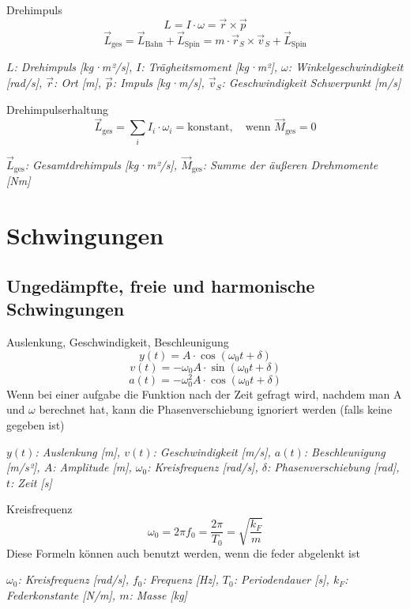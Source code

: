 \documentclass[a4paper,10pt]{article}
\newenvironment{displayformula}
{
	\begin{framed}
		\color{formulaColor}
	}
	{\end{framed}}
\newcommand{\formulalegend}[1]{%
	\par\vspace{0.5ex}%
	{{\color{legendColor}\RaggedRight\small\textit{#1}}}%
	\par\vspace{1.5ex}%
}
\begin{document}
\begin{displayformula}
	Drehimpuls
	\[
	L = I \cdot \omega = \vec{r} \times \vec{p}
	\]
	\[
	\vec{L}_{\text{ges}} = \vec{L}_{\text{Bahn}} + \vec{L}_{\text{Spin}} = m \cdot \vec{r}_S \times \vec{v}_S + \vec{L}_{\text{Spin}}
	\]
\end{displayformula}
\formulalegend{
	\( L \): Drehimpuls [kg·m²/s], \( I \): Trägheitsmoment [kg·m²], \( \omega \): Winkelgeschwindigkeit [rad/s], \( \vec{r} \): Ort [m], \( \vec{p} \): Impuls [kg·m/s], \( \vec{v}_S \): Geschwindigkeit Schwerpunkt [m/s]
}

\begin{displayformula}
	Drehimpulserhaltung
	\[
	\vec{L}_{\text{ges}} = \sum_i I_i \cdot \omega_i = \text{konstant}, \quad \text{wenn } \vec{M}_{\text{ges}} = 0
	\]
\end{displayformula}
\formulalegend{
	\( \vec{L}_{\text{ges}} \): Gesamtdrehimpuls [kg·m²/s], \( \vec{M}_{\text{ges}} \): Summe der äußeren Drehmomente [Nm]
}

\section{Schwingungen}

\subsection{Ungedämpfte, freie und harmonische Schwingungen}

\begin{displayformula}
	Auslenkung, Geschwindigkeit, Beschleunigung
	\[
	y(t) = A \cdot \cos(\omega_0 t + \delta)
	\]
	\[
	v(t) = -\omega_0 A \cdot \sin(\omega_0 t + \delta)
	\]
	\[
	a(t) = -\omega_0^2 A \cdot \cos(\omega_0 t + \delta)
	\]
	Wenn bei einer aufgabe die Funktion nach der Zeit gefragt wird, nachdem man A und $\omega$ berechnet hat, kann die Phasenverschiebung ignoriert werden (falls keine gegeben ist)
\end{displayformula}
\formulalegend{
	\( y(t) \): Auslenkung [m], \( v(t) \): Geschwindigkeit [m/s], \( a(t) \): Beschleunigung [m/s²], \( A \): Amplitude [m], \( \omega_0 \): Kreisfrequenz [rad/s], \( \delta \): Phasenverschiebung [rad], \( t \): Zeit [s]
}

\begin{displayformula}
	Kreisfrequenz
	\[
	\omega_0 = 2\pi f_0 = \frac{2\pi}{T_0} = \sqrt{\frac{k_F}{m}}
	\]
	Diese Formeln können auch benutzt werden, wenn die feder abgelenkt ist
\end{displayformula}
\formulalegend{
	\( \omega_0 \): Kreisfrequenz [rad/s], \( f_0 \): Frequenz [Hz], \( T_0 \): Periodendauer [s], \( k_F \): Federkonstante [N/m], \( m \): Masse [kg]
}
\end{document}
